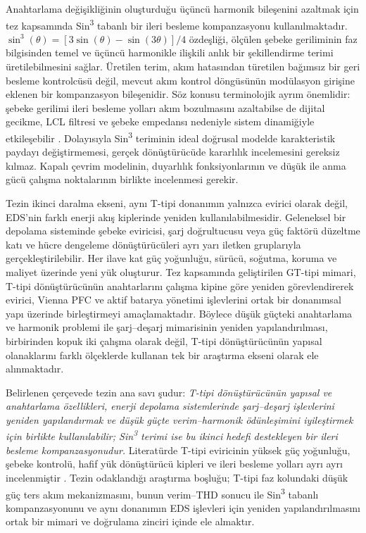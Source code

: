 Anahtarlama değişikliğinin oluşturduğu üçüncü harmonik bileşenini azaltmak için tez kapsamında Sin\textsuperscript{3} tabanlı bir ileri besleme kompanzasyonu kullanılmaktadır. $\sin^3(\theta)=[3\sin(\theta)-\sin(3\theta)]/4$ özdeşliği, ölçülen şebeke geriliminin faz bilgisinden temel ve üçüncü harmonikle ilişkili anlık bir şekillendirme terimi üretilebilmesini sağlar. Üretilen terim, akım hatasından türetilen bağımsız bir geri besleme kontrolcüsü değil, mevcut akım kontrol döngüsünün modülasyon girişine eklenen bir kompanzasyon bileşenidir. Söz konusu terminolojik ayrım önemlidir: şebeke gerilimi ileri besleme yolları akım bozulmasını azaltabilse de dijital gecikme, LCL filtresi ve şebeke empedansı nedeniyle sistem dinamiğiyle etkileşebilir \citep{Lu2016,Wang2024}. Dolayısıyla Sin\textsuperscript{3} teriminin ideal doğrusal modelde karakteristik paydayı değiştirmemesi, gerçek dönüştürücüde kararlılık incelemesini gereksiz kılmaz. Kapalı çevrim modelinin, duyarlılık fonksiyonlarının ve düşük ile anma gücü çalışma noktalarının birlikte incelenmesi gerekir.

Tezin ikinci daralma ekseni, aynı T-tipi donanımın yalnızca evirici olarak değil, EDS'nin farklı enerji akış kiplerinde yeniden kullanılabilmesidir. Geleneksel bir depolama sisteminde şebeke eviricisi, şarj doğrultucusu veya güç faktörü düzeltme katı ve hücre dengeleme dönüştürücüleri ayrı yarı iletken gruplarıyla gerçekleştirilebilir. Her ilave kat güç yoğunluğu, sürücü, soğutma, koruma ve maliyet üzerinde yeni yük oluşturur. Tez kapsamında geliştirilen GT-tipi mimari, T-tipi dönüştürücünün anahtarlarını çalışma kipine göre yeniden görevlendirerek evirici, Vienna PFC ve aktif batarya yönetimi işlevlerini ortak bir donanımsal yapı üzerinde birleştirmeyi amaçlamaktadır. Böylece düşük güçteki anahtarlama ve harmonik problemi ile şarj--deşarj mimarisinin yeniden yapılandırılması, birbirinden kopuk iki çalışma olarak değil, T-tipi dönüştürücünün yapısal olanaklarını farklı ölçeklerde kullanan tek bir araştırma ekseni olarak ele alınmaktadır.

Belirlenen çerçevede tezin ana savı şudur: \emph{T-tipi dönüştürücünün yapısal ve anahtarlama özellikleri, enerji depolama sistemlerinde şarj--deşarj işlevlerini yeniden yapılandırmak ve düşük güçte verim--harmonik ödünleşimini iyileştirmek için birlikte kullanılabilir; Sin\textsuperscript{3} terimi ise bu ikinci hedefi destekleyen bir ileri besleme kompanzasyonudur.} Literatürde T-tipi eviricinin yüksek güç yoğunluğu, şebeke kontrolü, hafif yük dönüştürücü kipleri ve ileri besleme yolları ayrı ayrı incelenmiştir \citep{Blaabjerg2006,Wang2020,Chen2010,Lu2016}. Tezin odaklandığı araştırma boşluğu; T-tipi faz kolundaki düşük güç ters akım mekanizmasını, bunun verim--THD sonucu ile Sin\textsuperscript{3} tabanlı kompanzasyonunu ve aynı donanımın EDS işlevleri için yeniden yapılandırılmasını ortak bir mimari ve doğrulama zinciri içinde ele almaktır.

